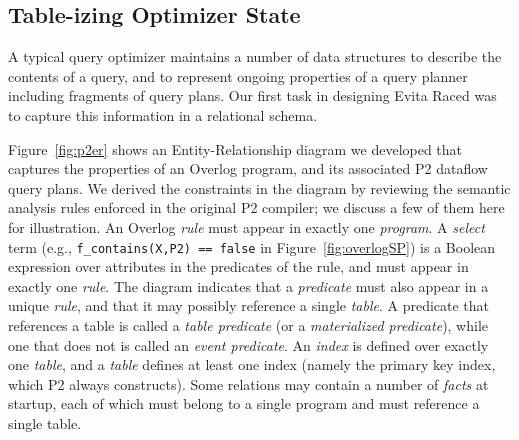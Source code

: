 \documentclass{sigmod08}
\newcommand{\ol}[1]{\texttt{\small #1}\xspace}
\begin{document}
\subsection{Table-izing Optimizer State}
A typical query optimizer maintains a number of data structures to describe the contents of a query, and to represent ongoing properties of a query planner including fragments of query plans.  Our first task in designing Evita Raced was to capture this information in a relational schema.

Figure~\ref{fig:p2er} shows an Entity-Relationship diagram we developed that captures the properties of an Overlog program, and its associated P2 dataflow query plans. 
We derived the constraints in the diagram by reviewing the semantic analysis rules enforced in the original P2 compiler; we discuss a few of them here for illustration.
An Overlog {\em rule} must appear in exactly one {\em program}. 
A {\em select} 
term (e.g., \ol{f\_contains(X,P2) == false} in Figure~\ref{fig:overlogSP}) is a Boolean expression over attributes in the predicates of the rule, and must appear in exactly one {\em rule}.  
The diagram indicates that a {\em predicate} 
must also appear in a unique {\em rule}, and that it may possibly reference a single {\em table}. A predicate
that references a table is called a {\em table predicate} (or a
\emph{materialized predicate}), while one that does not is called an {\em event predicate}. 
An {\em index} is defined over exactly one {\em table}, and a {\em table} defines at least
one index (namely the primary key index, which P2 always
constructs). Some relations may contain a number of {\em facts} at startup, 
each of which must belong to a single program and must reference a single table.
\end{document}
